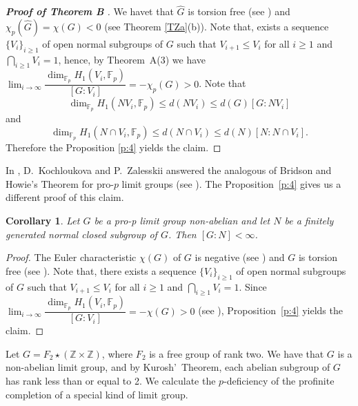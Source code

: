 \documentclass[10pt]{amsart}
\theoremstyle{plain}
\newtheorem{cor}[prop]{Corollary}
\theoremstyle{definition}
\theoremstyle{remark}
\numberwithin{prop}{section}
\numberwithin{example}{section}
\numberwithin{equation}{section}
\newcommand{\Z}{\mathbb{Z}}
\newcommand{\F}{\mathbb{F}}
\begin{document}
	\begin{proof}[\textbf{Proof of Theorem B} ]
 We  havet that 	$\widehat{G}$ is  torsion free (see \cite[Thm.~A and Thm.~E ]{TZ}) and $\chi_p(\widehat{G})=\chi(G)<0$ (see  Theorem \ref{TZa}(b)).  Note that, exists   a  sequence $\{V_{i}\}_{i\geq 1}$ of open normal  subgroups    of ${G}$  such that   $V_{i+1}\leq V_i$ for all  $i\geq 1$ and  $\displaystyle\bigcap_{i\geq 1}{V_i}=1$, hence, by    Theorem~A(3) we have $\displaystyle\lim_{i\rightarrow\infty} \displaystyle{\dfrac{\dim_{\F_p}H_1(V_i,{\F_p})}{[G:V_i]}}=-\chi_p(G)>0$. Note that  $$\dim_{\F_p}H_1(NV_i,\F_p)\leq d(NV_i)\leq d(G)[G: NV_i]$$ and   $$\dim_{\F_p}H_1(N\cap V_i,\F_p)\leq d(N\cap V_i)\leq d(N)[N:N\cap V_i].$$ Therefore    the Proposition  \ref{p:4}  yields the claim. 
	\end{proof}                                                     
	In \cite{AD}, D.~Kochloukova and P.~Zalesskii
		answered the analogous of Bridson and  Howie's Theorem for pro-$p$ limit groups (see \cite[\S 6, Thm.~6.7]{AD}). The Proposition~\ref{p:4} gives us a different proof of this claim.             
		 \begin{cor}
			Let  $G$ be a  pro-p limit group  non-abelian  and  let   $N$ be a finitely generated  normal closed subgroup  of  $G$. Then  $[{G}:N]<\infty$.  
		\end{cor}
		\begin{proof}
			The  Euler characteristic $\chi(G)$ of $G$ is negative (see \cite[\S 3, Thm.~3.6]{ABI}) and $G$ is  torsion free  (see \cite[\S 3, Thm.~3.5(ii)]{AD}).  Note that, there exists   a  sequence $\{V_{i}\}_{i\geq 1}$ of open normal  subgroups    of ${G}$  such that   $V_{i+1}\leq V_i$ for all  $i\geq 1$ and  $\displaystyle\bigcap_{i\geq 1}{V_i}=1$. Since $\displaystyle\lim_{i\rightarrow\infty} \displaystyle{\dfrac{\dim_{\F_p}H_1(V_i,{\F_p})}{[G:V_i]}}=-\chi(G)>0$ (see  \cite[\S 5, Thm.~5.3.(iii)]{AC}),  Proposition~\ref{p:4}  yields the claim. 
		\end{proof}
	 
Let $G=F_2\star (\Z\times \Z)$,  where $F_2$  is a free group of  rank two. We have that $G$ is a non-abelian limit group, and  by Kurosh'~Theorem,  each abelian subgroup of $G$ has  rank less than or equal to 2. 
We calculate    the $p$-deficiency  of the profinite completion of a special kind of limit group.
\end{document}
